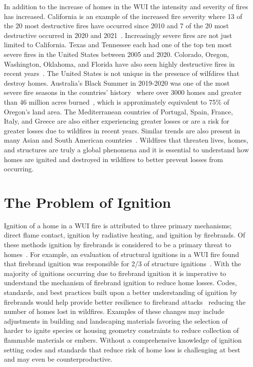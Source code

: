     In addition to the increase of homes in the WUI the intensity and severity of fires has increased. California is an example of the increased fire severity where 13 of the 20 most destructive fires have occurred since 2010 and 7 of the 20 most destructive occurred in 2020 and 2021~\cite{CALFIRE2018}. Increasingly severe fires are not just limited to California. Texas and Tennessee each had one of the top ten most severe fires in the United States between 2005 and 2020. Colorado, Oregon, Washington, Oklahoma, and Florida have also seen highly destructive fires in recent years~\cite{Barrett2020}. The United States is not unique in the presence of wilfdires that destroy homes. Australia's Black Summer in 2019-2020 was one of the most severe fire seasons in the countries' history~\cite{Levin2021Unveiling2019/2020} where over 3000 homes and greater than 46 million acres  burned~\cite{Filkov2020}, which is approximately equivalent to 75\% of Oregon's land area. The Mediterranean countries of Portugal, Spain, France, Italy, and Greece are also either experiencing greater losses or are a risk for greater losses due to wildfires in recent years. Similar trends are also present in many Asian and South American countries~\cite{Manzello2018}. Wildfires that threaten lives, homes, and structures are truly a global phenomena and it is essential to understand how homes are ignited and destroyed in wildfires to better prevent losses from occurring.

\section{The Problem of Ignition}
    Ignition of a home in a WUI fire is attributed to three primary mechanisms; direct flame contact, ignition by radiative heating, and ignition by firebrands. Of these methods ignition by firebrands is considered to be a primary threat to homes~\cite{Suzuki2021, Mell2010, Manzello2018FORUMResearch}. For example, an evaluation of structural ignitions in a WUI fire found that firebrand ignition was responsible for 2/3 of structure ignitions~\cite{Mell2011}. With the majority of ignitions occurring due to firebrand ignition it is imperative to understand the mechanism of firebrand ignition to reduce home losses. Codes, standards, and best practices built upon a better understanding of ignition by firebrands would help provide better resilience to firebrand attacks~\cite{Manzello2020} reducing the number of homes lost in wildfires. Examples of these changes may include adjustments in building and landscaping materials favoring the selection of harder to ignite species or housing geometry constraints to reduce collection of flammable materials or embers. Without a comprehensive knowledge of ignition setting codes and standards that reduce risk of home loss is challenging at best and may even be counterproductive.  
    
